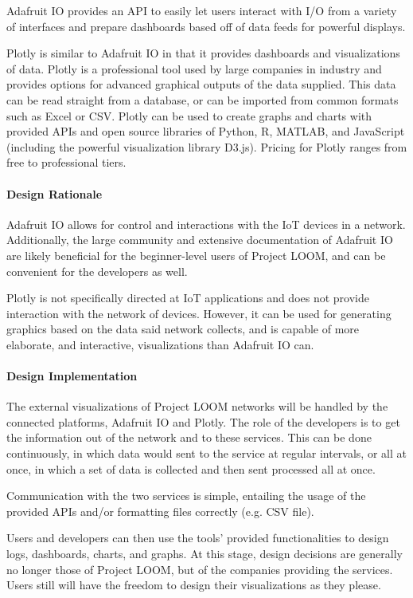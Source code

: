\documentclass[onecolumn, draftclsnofoot,10pt, compsoc]{IEEEtran}
\begin{document}
    Adafruit IO provides an API to easily let users interact with I/O from a variety of interfaces and prepare dashboards based off of data feeds for powerful displays. \cite{adafruitio}

    Plotly is similar to Adafruit IO in that it provides dashboards and visualizations of data. Plotly is a professional tool used by large companies in industry and provides options for advanced graphical outputs of the data supplied. This data can be read straight from a database, or can be imported from common formats such as Excel or CSV. Plotly can be used to create graphs and charts with provided APIs and open source libraries of Python, R, MATLAB, and JavaScript (including the powerful visualization library D3.js). Pricing for Plotly ranges from free to professional tiers. \cite{plotly}

\paragraph{Design Rationale}
    Adafruit IO allows for control and interactions with the IoT devices in a network. Additionally, the large community and extensive documentation of Adafruit IO are likely beneficial for the beginner-level users of Project LOOM, and can be convenient for the developers as well.

    Plotly is not specifically directed at IoT applications and does not provide interaction with the network of devices. However, it can be used for generating graphics based on the data said network collects, and is capable of more elaborate, and interactive, visualizations than Adafruit IO can.

\paragraph{Design Implementation}
    The external visualizations of Project LOOM networks will be handled by the connected platforms, Adafruit IO and Plotly. The role of the developers is to get the information out of the network and to these services. This can be done continuously, in which data would sent to the service at regular intervals, or all at once, in which a set of data is collected and then sent processed all at once. 

    Communication with the two services is simple, entailing the usage of the provided APIs and/or formatting files correctly (e.g. CSV file).

    Users and developers can then use the tools' provided functionalities to design logs, dashboards, charts, and graphs. At this stage, design decisions are generally no longer those of Project LOOM, but of the companies providing the services. Users still will have the freedom to design their visualizations as they please.
\end{document}
